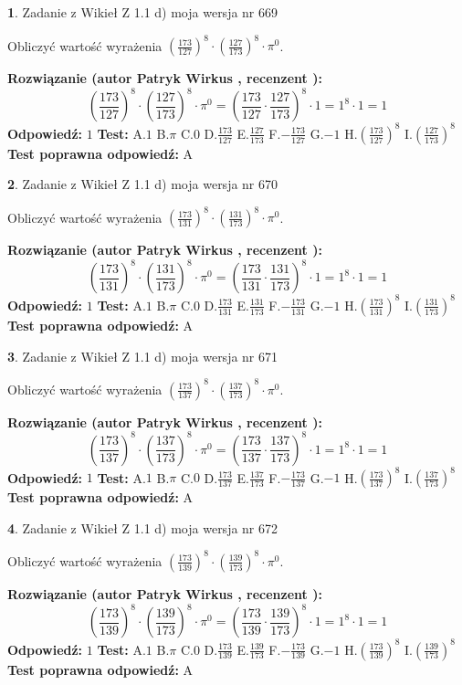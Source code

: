 \documentclass[12pt, a4paper]{article}
\theoremstyle{definition} %
\newtheorem{zad}{}
\newcommand{\zadStart}[1]{\begin{zad}#1\newline}
\newcommand{\zadStop}{\end{zad}}
\newcommand{\rozwStart}[2]{\noindent \textbf{Rozwiązanie (autor #1 , recenzent #2): }\newline}
\newcommand{\rozwStop}{\newline}
\newcommand{\odpStart}{\noindent \textbf{Odpowiedź:}\newline}
\newcommand{\odpStop}{\newline}
\newcommand{\testStart}{\noindent \textbf{Test:}\newline}
\newcommand{\testStop}{\newline}
\newcommand{\kluczStart}{\noindent \textbf{Test poprawna odpowiedź:}\newline}
\newcommand{\kluczStop}{\newline}
\begin{document}
\zadStart{Zadanie z Wikieł Z 1.1 d) moja wersja nr 669}

Obliczyć wartość wyrażenia $(\frac{173}{127})^{8} \cdot (\frac{127}{173})^{8} \cdot \pi^{0}$.
\zadStop
\rozwStart{Patryk Wirkus}{}
$$(\frac{173}{127})^{8} \cdot (\frac{127}{173})^{8} \cdot \pi^{0} = (\frac{173}{127} \cdot \frac{127}{173})^{8} \cdot 1 = 1^{8} \cdot 1 = 1$$
\rozwStop
\odpStart
$1$
\odpStop
\testStart
A.$1$ B.$\pi$ C.$0$ D.$\frac{173}{127}$ E.$\frac{127}{173}$
F.$-\frac{173}{127}$ G.$-1$
H.$(\frac{173}{127})^{8}$
I.$(\frac{127}{173})^{8}$
\testStop
\kluczStart
A
\kluczStop



\zadStart{Zadanie z Wikieł Z 1.1 d) moja wersja nr 670}

Obliczyć wartość wyrażenia $(\frac{173}{131})^{8} \cdot (\frac{131}{173})^{8} \cdot \pi^{0}$.
\zadStop
\rozwStart{Patryk Wirkus}{}
$$(\frac{173}{131})^{8} \cdot (\frac{131}{173})^{8} \cdot \pi^{0} = (\frac{173}{131} \cdot \frac{131}{173})^{8} \cdot 1 = 1^{8} \cdot 1 = 1$$
\rozwStop
\odpStart
$1$
\odpStop
\testStart
A.$1$ B.$\pi$ C.$0$ D.$\frac{173}{131}$ E.$\frac{131}{173}$
F.$-\frac{173}{131}$ G.$-1$
H.$(\frac{173}{131})^{8}$
I.$(\frac{131}{173})^{8}$
\testStop
\kluczStart
A
\kluczStop



\zadStart{Zadanie z Wikieł Z 1.1 d) moja wersja nr 671}

Obliczyć wartość wyrażenia $(\frac{173}{137})^{8} \cdot (\frac{137}{173})^{8} \cdot \pi^{0}$.
\zadStop
\rozwStart{Patryk Wirkus}{}
$$(\frac{173}{137})^{8} \cdot (\frac{137}{173})^{8} \cdot \pi^{0} = (\frac{173}{137} \cdot \frac{137}{173})^{8} \cdot 1 = 1^{8} \cdot 1 = 1$$
\rozwStop
\odpStart
$1$
\odpStop
\testStart
A.$1$ B.$\pi$ C.$0$ D.$\frac{173}{137}$ E.$\frac{137}{173}$
F.$-\frac{173}{137}$ G.$-1$
H.$(\frac{173}{137})^{8}$
I.$(\frac{137}{173})^{8}$
\testStop
\kluczStart
A
\kluczStop



\zadStart{Zadanie z Wikieł Z 1.1 d) moja wersja nr 672}

Obliczyć wartość wyrażenia $(\frac{173}{139})^{8} \cdot (\frac{139}{173})^{8} \cdot \pi^{0}$.
\zadStop
\rozwStart{Patryk Wirkus}{}
$$(\frac{173}{139})^{8} \cdot (\frac{139}{173})^{8} \cdot \pi^{0} = (\frac{173}{139} \cdot \frac{139}{173})^{8} \cdot 1 = 1^{8} \cdot 1 = 1$$
\rozwStop
\odpStart
$1$
\odpStop
\testStart
A.$1$ B.$\pi$ C.$0$ D.$\frac{173}{139}$ E.$\frac{139}{173}$
F.$-\frac{173}{139}$ G.$-1$
H.$(\frac{173}{139})^{8}$
I.$(\frac{139}{173})^{8}$
\testStop
\kluczStart
A
\kluczStop
\end{document}
